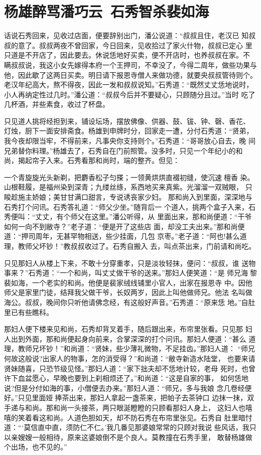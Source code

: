 \chapter{杨雄醉骂潘巧云~石秀智杀裴如海}

话说石秀回来，见收过店面，便要辞别出门，潘公说道：“叔叔且住，老汉已
知叔叔的意了。叔叔两夜不曾回家，今日回来，见收拾过了家火什物，叔叔已定心
里只道是不开店了，因此要去。休说恁地好买卖，便不开店时，也养叔叔在家。不
瞒叔叔说，我这小女先嫁得本府一个王押司，不幸没了，今得二周年，做些功果与
他，因此歇了这两日买卖。明日请下报恩寺僧人来做功德，就要央叔叔管待则个。
老汉年纪高大，熬不得夜，因此一发和叔叔说知。”石秀道：“既然丈丈恁地说时，
小人再纳定性过几时。”潘公道：“叔叔今后并不要疑心，只顾随分且过。”当时
吃了几杯酒，并些素食，收过了杯盘。

只见道人挑将经担到来，铺设坛场，摆放佛像、供器、鼓、钹、钟、磬、香花、
灯烛，厨下一面安排斋食。杨雄到申牌时分，回家走一遭，分付石秀道：“贤弟，
我今夜却限当牢，不得前来，凡事央你支持则个。”石秀道：“哥哥放心自去，晚
间兄弟替你料理。”杨雄去了，石秀自在门前照管。没多时，只见一个年纪小的和
尚，揭起帘子入来。石秀看那和尚时，端的整齐。但见：

一个青旋旋光头新剃，把麝香松子匀搽；一领黄烘烘直裰初缝，使沉速檀香
染。山根鞋履，是福州染到深青；九缕丝绦，系西地买来真紫。光溜溜一双贼眼，
只睃趁施主娇娘；美甘甘满口甜言，专说诱丧家少妇。
那和尚入到里面，深深地与石秀打个问讯。石秀答礼道：“师父少坐。”随背后一
个道人，挑两个盒子入来，石秀便叫：“丈丈，有个师父在这里。”潘公听得，从
里面出来，那和尚便道：“干爷如何一向不到敝寺？”老子道：“便是开了这些店
面，却没工夫出来。”那和尚便道：“押司周年，无甚罕物相送，些少挂面，几包
京枣。”老子道：“阿也!甚么道理，教师父坏钞！”教叔叔收过了。石秀自搬入
去，叫点茶出来，门前请和尚吃。

只见那妇人从楼上下来，不敢十分穿重孝，只是淡妆轻抹，便问：“叔叔，谁
送物事来？”石秀道：“一个和尚，叫丈丈做干爷的送来。”那妇人便笑道：“是
师兄海黎裴如海，一个老实的和尚。他便是裴家绒线铺里小官人，出家在报恩寺
中。因他师父是家里门徒，结拜我父做干爷，长奴两岁，因此上叫他做师兄。他法
名叫做海公。叔叔，晚间你只听他请佛念经，有这般好声音。”石秀道：“原来恁
地。”自肚里已有些瞧科。

那妇人便下楼来见和尚，石秀却背叉着手，随后跟出来，布帘里张看。只见那
妇人出到外面，那和尚便起身向前来，合掌深深的打个问讯。那妇人便道：“甚么
道理，教师兄坏钞！”和尚道：“贤妹，些少薄礼微物，不足挂齿。”那妇人道：
“师兄何故这般说?出家人的物事，怎的消受得？”和尚道：“敝寺新造水陆堂，
也要来请贤妹随喜，只恐节级见怪。”那妇人道：“家下拙夫却不恁地计较，老母
死时，也曾许下血盆愿心，早晚也要到上刹相烦还了。”和尚道：“这是自家的事，
如何恁地说?但是分付如海的事，小僧便去办来。”那妇人道：“师兄，多与我娘
念几卷经便好。”只见里面娅捧茶出来，那妇人拿起一盏茶来，把帕子去茶钟口
边抹一抹，双手递与和尚。那和尚一头接茶，两只眼涎瞪瞪的只顾看那妇人身上，
这妇人也嘻嘻的笑着看这和尚。人道色胆如天，却不防石秀在布帘里张见。石秀自
肚里暗忖道：“‘莫信直中直，须防仁不仁。’我几番见那婆娘常常的只顾对我说
些风话，我只以亲嫂嫂一般相待，原来这婆娘倒不是个良人。莫教撞在石秀手里，
敢替杨雄做个出场，也不见的。”

